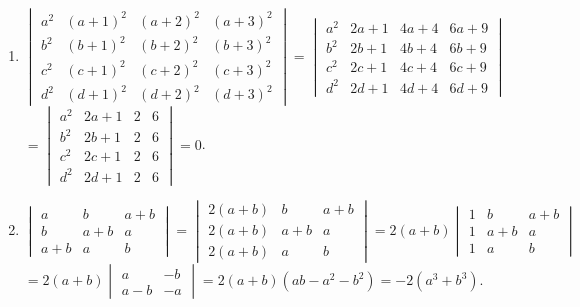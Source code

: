\begin{enumerate}
			\item %
			      $\begin{vmatrix}
					      a^2 & (a+1)^2 & (a+2)^2 & (a+3)^2 \\
					      b^2 & (b+1)^2 & (b+2)^2 & (b+3)^2 \\
					      c^2 & (c+1)^2 & (c+2)^2 & (c+3)^2 \\
					      d^2 & (d+1)^2 & (d+2)^2 & (d+3)^2
				      \end{vmatrix} = \begin{vmatrix}
					      a^2 & 2a+1 & 4a+4 & 6a+9 \\
					      b^2 & 2b+1 & 4b+4 & 6b+9 \\
					      c^2 & 2c+1 & 4c+4 & 6c+9 \\
					      d^2 & 2d+1 & 4d+4 & 6d+9
				      \end{vmatrix}$
			      $= \begin{vmatrix}
					      a^2 & 2a+1 & 2 & 6 \\
					      b^2 & 2b+1 & 2 & 6 \\
					      c^2 & 2c+1 & 2 & 6 \\
					      d^2 & 2d+1 & 2 & 6
				      \end{vmatrix} = 0$.

			\item %
			      $\begin{vmatrix}
					      a   & b   & a+b \\
					      b   & a+b & a   \\
					      a+b & a   & b
				      \end{vmatrix} = \begin{vmatrix}
					      2(a+b) & b   & a+b \\
					      2(a+b) & a+b & a   \\
					      2(a+b) & a   & b
				      \end{vmatrix} = 2(a+b)\begin{vmatrix}
					      1 & b   & a+b \\
					      1 & a+b & a   \\
					      1 & a   & b
				      \end{vmatrix}$
			      $= 2(a+b)\begin{vmatrix}
					      a   & -b \\
					      a-b & -a
				      \end{vmatrix} = 2(a+b)(ab-a^2-b^2) = -2(a^3+b^3)$.
		\end{enumerate}



